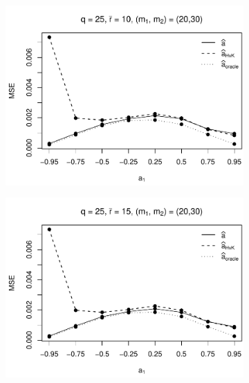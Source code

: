 \begin{figure}[h!]
\begin{subfigure}[b]{0.45\textwidth}
\includegraphics[width=\textwidth]{Plots/Robustness/MSE_a1_T=500_slope=1_(q,r,M1,M2)=(25,10,20,30).pdf}
\end{subfigure}
\hspace{0.25cm}
\begin{subfigure}[b]{0.45\textwidth}
\includegraphics[width=\textwidth]{Plots/Robustness/MSE_a1_T=500_slope=1_(q,r,M1,M2)=(25,15,20,30).pdf}
\end{subfigure}


\end{figure}
